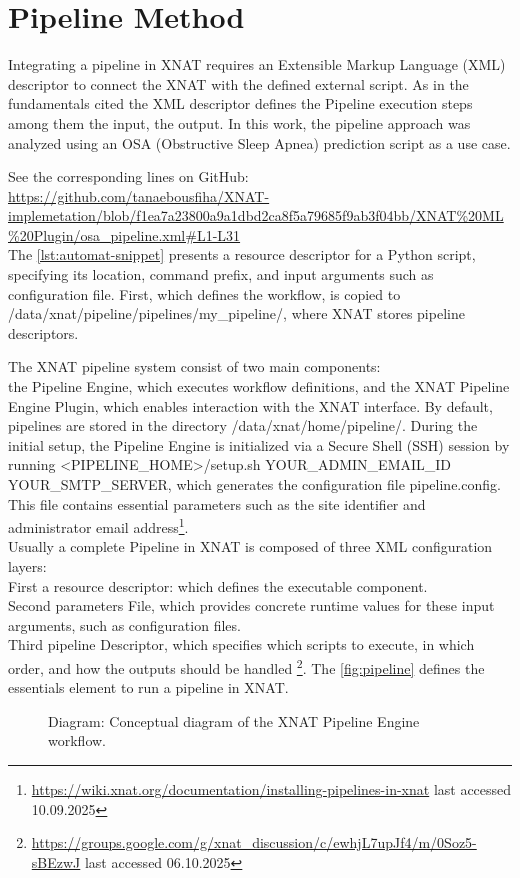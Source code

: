 
\section{Pipeline Method}

Integrating a pipeline in XNAT requires an Extensible Markup Language (XML) descriptor to connect the XNAT with the defined external script. As in the fundamentals cited the XML descriptor defines the Pipeline execution steps among them the input, the output. In this work, the pipeline approach was analyzed using an OSA (Obstructive Sleep Apnea) prediction script as a use case.
\normalsize



\noindent\footnotesize See the corresponding lines on GitHub:\url{ https://github.com/tanaebousfiha/XNAT-implemetation/blob/f1ea7a23800a9a1dbd2ca8f5a79685f9ab3f04bb/XNAT%20ML%20Plugin/osa_pipeline.xml#L1-L31}
\normalsize
\\
The \autoref{lst:automat-snippet} presents a resource descriptor for a Python script, specifying its location, command prefix, and input arguments such as configuration file. First, which defines the workflow, is copied to /data/xnat/pipeline/pipelines/my\_pipeline/, where XNAT stores pipeline descriptors. 

The XNAT pipeline system consist of two main components: \\
the Pipeline Engine, which executes workflow definitions, and the XNAT Pipeline Engine Plugin, which enables interaction with the XNAT interface.
By default, pipelines are stored in the directory /data/xnat/home/pipeline/. During the initial setup, the Pipeline Engine is initialized via a Secure Shell (SSH) session by running
<PIPELINE\_HOME>/setup.sh YOUR\_ADMIN\_EMAIL\_ID YOUR\_SMTP\_SERVER,
which generates the configuration file pipeline.config. This file contains essential parameters such as the site identifier and administrator email address\footnote{\url{https://wiki.xnat.org/documentation/installing-pipelines-in-xnat} last accessed 10.09.2025}.\\
Usually a complete Pipeline in XNAT is composed of three XML configuration layers:\\
First a resource descriptor: which defines the executable component. \\
Second parameters File, which provides concrete runtime values for these input arguments, such as configuration files.\\
Third pipeline Descriptor, which  specifies which scripts to execute, in which order, and how the outputs should be handled \footnote{\url{https://groups.google.com/g/xnat_discussion/c/ewhjL7upJf4/m/0Soz5-sBEzwJ} last accessed 06.10.2025}. The \autoref{fig:pipeline} defines the essentials element to run a pipeline in XNAT. 
\begin{figure}[H]
    \centering
    \def\svgwidth{0.9\linewidth}
    
    \caption{ Diagram: Conceptual diagram of the XNAT Pipeline Engine workflow.}
    \label{fig:pipeline}
\end{figure}

